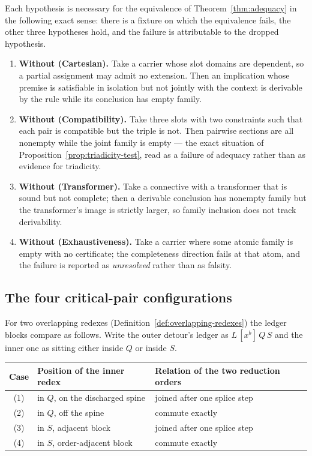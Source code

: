 Each hypothesis is necessary for the equivalence of Theorem~\ref{thm:adequacy} in the
following exact sense: there is a fixture on which the equivalence fails, the other three
hypotheses hold, and the failure is attributable to the dropped hypothesis.

\begin{enumerate}
\item \textbf{Without (Cartesian).}  Take a carrier whose slot domains are dependent, so a
  partial assignment may admit no extension.  Then an implication whose premise is
  satisfiable in isolation but not jointly with the context is derivable by the rule while
  its conclusion has empty family.
\item \textbf{Without (Compatibility).}  Take three slots with two constraints such that each
  pair is compatible but the triple is not.  Then pairwise sections are all nonempty while
  the joint family is empty --- the exact situation of
  Proposition~\ref{prop:triadicity-test}, read as a failure of adequacy rather than as
  evidence for triadicity.
\item \textbf{Without (Transformer).}  Take a connective with a transformer that is sound but
  not complete; then a derivable conclusion has nonempty family but the transformer's image
  is strictly larger, so family inclusion does not track derivability.
\item \textbf{Without (Exhaustiveness).}  Take a carrier where some atomic family is empty
  with no certificate; the completeness direction fails at that atom, and the failure is
  reported as \emph{unresolved} rather than as falsity.
\end{enumerate}

\subsection{The four critical-pair configurations}

For two overlapping redexes (Definition~\ref{def:overlapping-redexes}) the ledger blocks
compare as follows.  Write the outer detour's ledger as $L\,[x^{b}]\,Q\,S$ and the inner one
as sitting either inside $Q$ or inside $S$.

\begin{center}
\begin{tabular}{@{}clp{}@{}}
\toprule
Case & Position of the inner redex & Relation of the two reduction orders \\
\midrule
(1) & in $Q$, on the discharged spine & joined after one splice step \\
(2) & in $Q$, off the spine & commute exactly \\
(3) & in $S$, adjacent block & joined after one splice step \\
(4) & in $S$, order-adjacent block & commute exactly \\
\bottomrule
\end{tabular}
\end{center}

